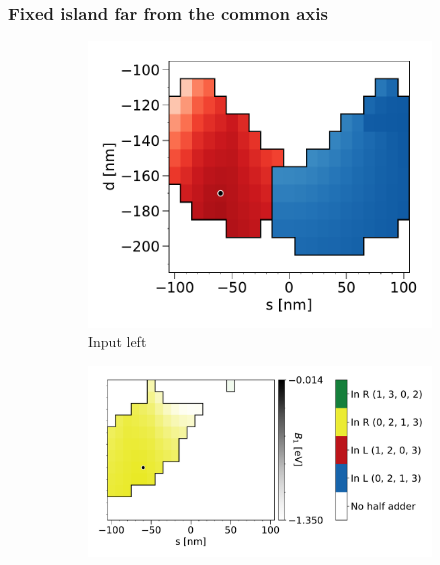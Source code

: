 \documentclass[11pt,a4paper,english,twoside]{article}
\begin{document}
\subsubsection{Fixed island far from the common axis}
\begin{figure}
    \centering
    \begin{subfigure}[t]{0.396\textwidth}
        \includegraphics[width=\textwidth]{Figures/half_adder/sweep/000006_d-s/table(d100-210_10,s-100-100_10)_balanced1_L.pdf}
        \caption{Input left}
    \label{fig:HalfAdder_000006_sweep_d-s_balanced1-L}
    \end{subfigure}
    \begin{subfigure}[t]{0.594\textwidth}
        \includegraphics[width=\textwidth]{Figures/half_adder/sweep/000006_d-s/table(d100-210_10,s-100-100_10)_balanced1_R.pdf}

\end{subfigure}
\end{figure}
\end{document}
